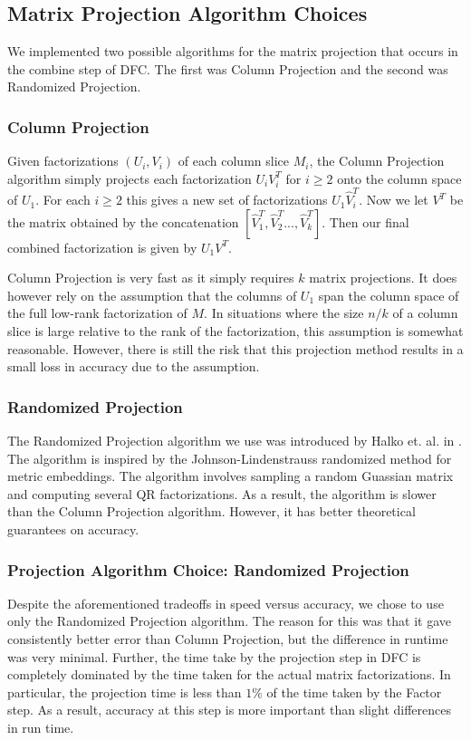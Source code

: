 \subsection{Matrix Projection Algorithm Choices}
We implemented two possible algorithms for the matrix projection that occurs in the combine step of DFC. The first was Column Projection and the second was Randomized Projection.

\subsubsection{Column Projection}
Given factorizations $(U_i,V_i)$ of each column slice $M_i$, the Column Projection algorithm simply projects each factorization $U_i V_i^T$ for $i \geq 2$ onto the column space of $U_1$. For each $i \geq 2$ this gives a new set of factorizations $U_1 \hat{V}_i^T$. Now we let $V^T$ be the  matrix obtained by the concatenation $[\hat{V}_1^T, \hat{V}_2^T..., \hat{V}_k^T]$. Then our final combined factorization is given by $U_1 V^T$.

Column Projection is very fast as it simply requires $k$ matrix projections. It does however rely on the assumption that the columns of $U_1$ span the column space of the full low-rank factorization of $M$. In situations where the size $n/k$ of a column slice is large relative to the rank of the factorization, this assumption is somewhat reasonable. However, there is still the risk that this projection method results in a small loss in accuracy due to the assumption.

\subsubsection{Randomized Projection}
The Randomized Projection algorithm we use was introduced by Halko et. al. in \cite{Halko}. The algorithm is inspired by the Johnson-Lindenstrauss randomized method for metric embeddings. The algorithm involves sampling a random Guassian matrix and computing several QR factorizations. As a result, the algorithm is slower than the Column Projection algorithm. However, it has better theoretical guarantees on accuracy.

\subsubsection{Projection Algorithm Choice: Randomized Projection}
Despite the aforementioned tradeoffs in speed versus accuracy, we chose to use only the Randomized Projection algorithm. The reason for this was that it gave consistently better error than Column Projection, but the difference in runtime was very minimal. Further, the time take by the projection step in DFC is completely dominated by the time taken for the actual matrix factorizations. In particular, the projection time is less than $1\%$ of the time taken by the Factor step. As a result, accuracy at this step is more important than slight differences in run time. 